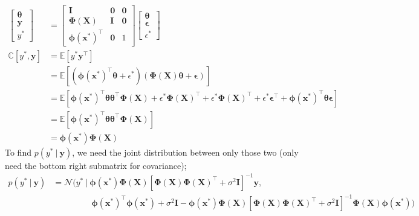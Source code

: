 \documentclass[a4paper, 12pt]{article}
\newcommand{\mat}[1]{\boldsymbol{#1}}
\renewcommand{\vec}[1]{\boldsymbol{#1}}
\begin{document}
            \begin{align*}
                \begin{bmatrix}
                    \vec{\theta} \\
                    \vec{y} \\
                    y^*
                \end{bmatrix} & = \begin{bmatrix}
                    \mat{I} & \mat{0} & \mat{0} \\
                    \mat{\Phi}(\mat{X}) & \mat{I} & \mat{0} \\
                    \vec{\phi}(\vec{x^*})^\top & \mat{0} & 1
                \end{bmatrix} \begin{bmatrix}
                    \vec{\theta} \\
                    \vec{\epsilon} \\
                    \epsilon^*
                \end{bmatrix} \\
                \mathbb{C}[y^*, \vec{y}] & = \mathbb{E}[y^*\vec{y}^\top] \\
                & = \mathbb{E}[(\vec{\phi}(\vec{x^*})^\top\vec{\theta} + \epsilon^*)(\mat{\Phi}(\mat{X})\vec{\theta} + \vec{\epsilon})] \\
                & = \mathbb{E}[\vec{\phi}(\vec{x^*})^\top\vec{\theta}\vec{\theta}^\top\mat{\Phi}(\mat{X}) + \epsilon^*\mat{\Phi}(\mat{X})^\top + \epsilon^*\mat{\Phi}(\mat{X})^\top + \epsilon^*\vec{\epsilon}^\top + \vec{\phi}(\vec{x^*})^\top\vec{\theta}\vec{\epsilon}] \\
                & = \mathbb{E}[\vec{\phi}(\vec{x^*})^\top\vec{\theta}\vec{\theta}^\top\mat{\Phi}(\mat{X})] \\
                & = \vec{\phi}(\vec{x^*})\mat{\Phi}(\mat{X})
            \end{align*}
            To find $p(y^*\ |\ \vec{y})$, we need the joint distribution between only those two (only need the bottom right submatrix for covariance);
            \begin{align*}
                p(y^*\ |\ \vec{y}) & = \mathcal{N}(y^*\ |\ \vec{\phi}(\vec{x^*})\mat{\Phi}(\mat{X})[\mat{\Phi}(\mat{X})\mat{\Phi}(\mat{X})^\top + \sigma^2 \mat{I}]^{-1}\vec{y}, \\
                & \phantom{= \mathcal{N}(y^*\ |\ \ } \vec{\phi}(\vec{x^*})^\top\vec{\phi}(\vec{x^*}) + \sigma^2\mat{I} - \vec{\phi}(\vec{x^*})\mat{\Phi}(\mat{X})[\mat{\Phi}(\mat{X})\mat{\Phi}(\mat{X})^\top + \sigma^2 \mat{I}]^{-1}\mat{\Phi}(\mat{X})\vec{\phi}(\vec{x^*}))
            \end{align*}
\end{document}
